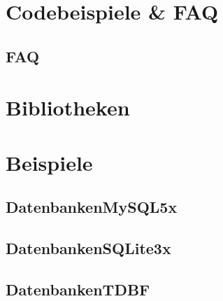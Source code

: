 \documentclass[
titlepage,						%
]
{scrreprt}
\begin{document}
\chapter{Codebeispiele \& FAQ}
\section[FAQ]{FAQ}

\newpage
\chapter[Bibliotheken]{Bibliotheken}

\newpage

\newpage
\chapter{Beispiele}
\section[Datenbanken MySQL 5.x]{DatenbankenMySQL5x}



\newpage


\newpage
\section[Datenbanken SQLite 3.x]{DatenbankenSQLite3x}
%
%
%

\section[Datenbanken DBase, FoxPro]{DatenbankenTDBF}
%
%
%
\end{document}
